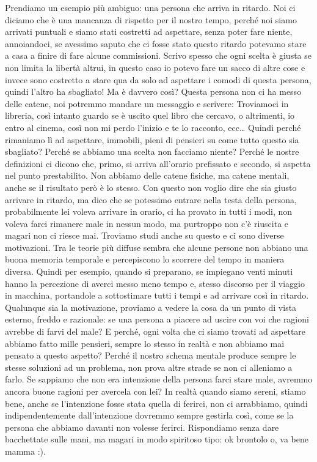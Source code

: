 \documentclass[12pt]{book} %
\begin{document}
Prendiamo un esempio più ambiguo:
una persona che arriva in ritardo. Noi ci diciamo che è una mancanza di rispetto per
il nostro tempo, perché noi siamo arrivati puntuali e siamo stati costretti ad aspettare, senza poter fare niente,
annoiandoci, se avessimo saputo che ci fosse stato questo ritardo potevamo stare a casa a finire di fare alcune commissioni.
Scrivo spesso che ogni scelta è giusta se non limita la libertà altrui, in questo caso io potevo fare un sacco di
altre cose e invece sono costretto a stare qua da solo ad aspettare i comodi di questa persona, quindi l'altro ha
sbagliato! Ma è davvero così? Questa persona non ci ha messo delle catene, noi potremmo mandare un messaggio e
scrivere: Troviamoci in libreria, così intanto guardo se è uscito quel libro che cercavo, o altrimenti, io entro al
cinema, così non mi perdo l'inizio e te lo racconto, ecc… Quindi perché rimaniamo lì ad aspettare,
immobili, pieni di pensieri su come tutto questo sia sbagliato? Perché se abbiamo una scelta non facciamo niente?
Perché le nostre definizioni ci dicono che, primo, si arriva all'orario prefissato e secondo, si
aspetta nel punto prestabilito. Non abbiamo delle catene fisiche, ma catene mentali, anche se il risultato però è lo
stesso. Con questo non voglio dire che sia giusto arrivare in ritardo, ma dico che se potessimo entrare nella testa
della persona, probabilmente lei voleva arrivare in orario, ci ha provato in tutti i modi, non voleva farci rimanere
male in nessun modo, ma purtroppo non c'è riuscita e magari non ci riesce mai. Troviamo studi
anche su questo e ci sono diverse motivazioni. Tra le teorie più diffuse sembra che alcune persone non abbiano una
buona memoria temporale e percepiscono lo scorrere del tempo in maniera diversa. Quindi per esempio, quando si
preparano, se impiegano venti minuti hanno la percezione di averci messo meno tempo e, stesso discorso per il viaggio
in macchina, portandole a sottostimare tutti i tempi e ad arrivare così in ritardo. Qualunque sia la motivazione,
proviamo a vedere la cosa da un punto di vista esterno, freddo e razionale: se una persona a piacere ad uscire con voi
che ragioni avrebbe di farvi del male? E perché, ogni volta che ci siamo trovati ad aspettare abbiamo fatto mille
pensieri, sempre lo stesso in realtà e non abbiamo mai pensato a questo aspetto? Perché il nostro schema mentale
produce sempre le stesse soluzioni ad un problema, non prova altre strade se non ci alleniamo a farlo. Se sappiamo che
non era intenzione della persona farci stare male, avremmo ancora buone ragioni per avercela con lei? In realtà quando
siamo sereni, stiamo bene, anche se l'intenzione fosse stata quella di ferirci, non ci arrabbiamo,
quindi indipendentemente dall'intenzione dovremmo sempre gestirla così, come se la persona che
abbiamo davanti non volesse ferirci. Rispondiamo senza dare bacchettate sulle mani, ma magari in modo spiritoso tipo:
ok brontolo o, va bene mamma :).
\end{document}
